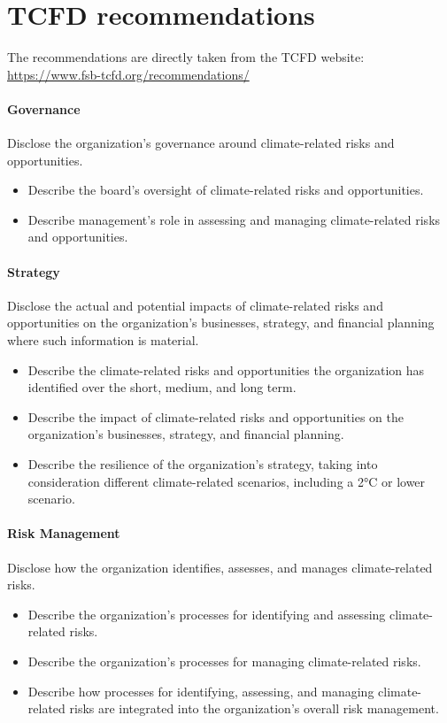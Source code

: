 \section{TCFD recommendations}
\label{app:tcfd}
The recommendations are directly taken from the TCFD website: \url{https://www.fsb-tcfd.org/recommendations/}

\paragraph{Governance}Disclose the organization’s governance around climate-related risks and opportunities.
\begin{itemize}
    \item Describe the board’s oversight of climate-related risks and opportunities.
    \item Describe management’s role in assessing and managing climate-related risks and opportunities.
\end{itemize}
 
\paragraph{Strategy} Disclose the actual and potential impacts of climate-related risks and opportunities on the organization’s businesses, strategy, and financial planning where such information is material.
\begin{itemize}
    \item Describe the climate-related risks and opportunities the organization has identified over the short, medium, and long term.
    \item Describe the impact of climate-related risks and opportunities on the organization’s businesses, strategy, and financial planning.
    \item Describe the resilience of the organization’s strategy, taking into consideration different climate-related scenarios, including a 2°C or lower scenario.
\end{itemize}

\paragraph{Risk Management} Disclose how the organization identifies, assesses, and manages climate-related risks.
\begin{itemize}
    \item Describe the organization’s processes for identifying and assessing climate-related risks.
    \item  Describe the organization’s processes for managing climate-related risks.
    \item Describe how processes for identifying, assessing, and managing climate-related risks are integrated into the organization’s overall risk management.
\end{itemize}

